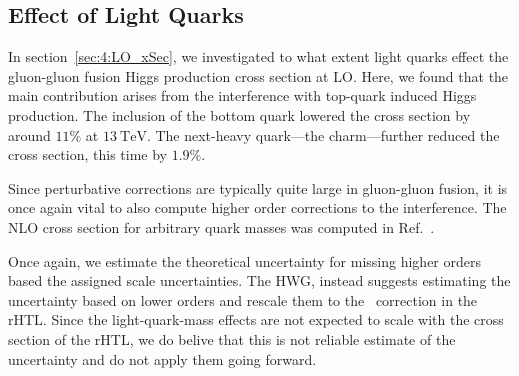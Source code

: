 \subsection{Effect of Light Quarks}
In section~\ref{sec:4:LO_xSec}, we investigated to what extent light quarks effect the gluon-gluon fusion Higgs production cross section at \acs{LO}. Here, we found that the main contribution arises from the interference with top-quark induced Higgs production. The inclusion of the bottom quark lowered the cross section by around $11\%$ at $13\ \mathrm{TeV}$. The next-heavy quark---the charm---further reduced the cross section, this time by $1.9\%$.

Since perturbative corrections are typically quite large in gluon-gluon fusion, it is once again vital to also compute higher order corrections to the interference. The \acs{NLO} cross section for arbitrary quark masses was computed in Ref.~\cite{Graudenz:1992pv}.

Once again, we estimate the theoretical uncertainty for missing higher orders based the assigned scale uncertainties. The HWG, instead suggests estimating the uncertainty based on lower orders and rescale them to the \NNNLO\ correction in the \acs{rHTL}. Since the light-quark-mass effects are not expected to scale with the cross section of the \acs{rHTL}, we do belive that this is not reliable estimate of the uncertainty and do not apply them going forward.

